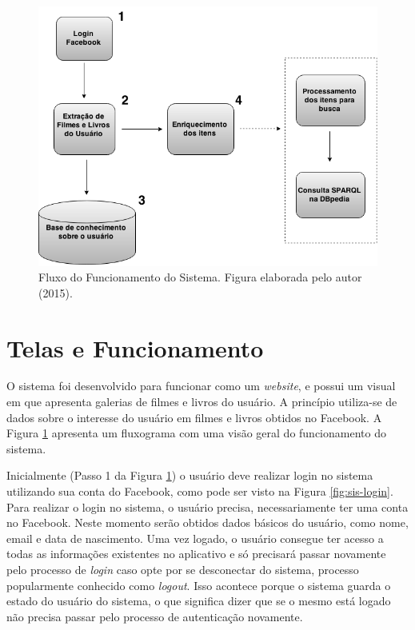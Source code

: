 \begin{figure}
	\centering
	\includegraphics[scale=0.6]{imagens/arquitetura.png}
	\caption{Fluxo do Funcionamento do Sistema. Figura elaborada pelo autor (2015).}
	\label{fig:funcionamento}
\end{figure}



\section{Telas e Funcionamento}

O sistema foi desenvolvido para funcionar como um \textit{website}, e possui  um visual em que apresenta galerias de filmes e livros do usuário. A princípio utiliza-se de dados sobre o interesse do usuário em filmes e livros obtidos no Facebook. A Figura \ref{fig:funcionamento} apresenta um fluxograma com uma visão geral do funcionamento do sistema.

Inicialmente (Passo 1 da Figura \ref{fig:funcionamento}) o usuário deve realizar login no sistema utilizando sua conta do Facebook, como pode ser visto na Figura \ref{fig:sis-login}. Para realizar o login no sistema, o usuário precisa, necessariamente ter uma conta no Facebook. Neste momento serão obtidos dados básicos do usuário, como nome, email e data de nascimento. Uma vez logado, o usuário consegue ter acesso a todas as informações existentes no aplicativo e só precisará passar novamente pelo processo de \textit{login} caso opte por se desconectar do sistema, processo popularmente conhecido como \textit{logout}. Isso acontece porque o sistema guarda o estado do usuário do sistema, o que significa dizer que se o mesmo está logado não precisa passar pelo processo de autenticação novamente.

